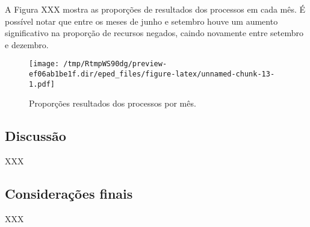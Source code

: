 \documentclass[10pt,]{article}
\begin{document}
A Figura XXX mostra as proporções de resultados dos processos em cada
mês. É possível notar que entre os meses de junho e setembro houve um
aumento significativo na proporção de recursos negados, caindo novamente
entre setembro e dezembro.

\begin{figure}[htbp]
\centering
\texttt{[image: /tmp/RtmpWS90dg/preview-ef06ab1be1f.dir/eped\_files/figure-latex/unnamed-chunk-13-1.pdf]}
\caption{Proporções resultados dos processos por mês.}
\end{figure}

\subsection{Discussão}\label{discussao}

XXX

\subsection{Considerações finais}\label{consideracoes-finais}

XXX
\end{document}
